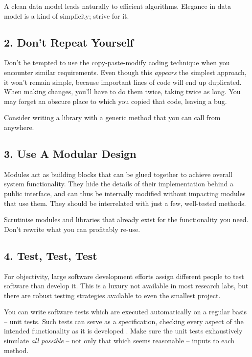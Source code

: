 \documentclass{bmcart}
\begin{document}
A clean data model leads naturally to efficient algorithms. Elegance in data model is a kind of simplicity; strive for it. 

\subsection*{2. Don't Repeat Yourself}

Don't be tempted to use the copy-paste-modify coding technique when you encounter similar requirements. Even though this \textit{appears} the simplest approach, it won't remain simple, because important lines of code will end up duplicated. When making changes, you'll have to do them twice, taking twice as long. You may forget an obscure place to which you copied that code, leaving a bug. 

Consider writing a library with a generic method that you can call from anywhere.  

\subsection*{3. Use A Modular Design}

Modules act as building blocks that can be glued together to achieve overall system functionality. They hide the details of their implementation behind a public interface, and can thus be internally modified without impacting modules that use them. They should be interrelated with just a few, well-tested methods. 

Scrutinise modules and libraries that already exist for the functionality you need. Don't rewrite what you can profitably re-use.   

\subsection*{4. Test, Test, Test}

For objectivity, large software development efforts assign different people to test software than develop it. This is a luxury not available in most research labs, but there are robust testing strategies available to even the smallest project. 

You can write software tests which are executed automatically on a regular basis -- unit tests. Such tests can serve as a specification, checking every aspect of the intended functionality as it is developed \cite{tdd}. Make sure the unit tests exhaustively simulate \textit{all possible} -- not only that which seems reasonable -- inputs to each method. 
\end{document}
